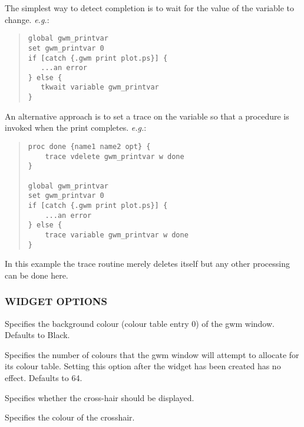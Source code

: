 The simplest way to detect completion is to wait for the value of the 
variable to change. {\em{e.g.}}: 

\begin{quote}
\begin{verbatim}
global gwm_printvar
set gwm_printvar 0
if [catch {.gwm print plot.ps}] {
   ...an error
} else {
   tkwait variable gwm_printvar
}
\end{verbatim}
\end{quote}

An alternative approach is to set a trace on the variable so that a 
procedure is invoked when the print completes. {\em{e.g.}}:

\begin{quote}
\begin{verbatim}
proc done {name1 name2 opt} {
    trace vdelete gwm_printvar w done
}

global gwm_printvar
set gwm_printvar 0
if [catch {.gwm print plot.ps}] {
    ...an error
} else {
    trace variable gwm_printvar w done
}
\end{verbatim}
\end{quote}

In this example the trace routine merely deletes itself but any other
processing can be done here.

\subsubsection{WIDGET OPTIONS}

\begin{rquote}
Specifies the background colour (colour table entry 0) of the gwm window.
Defaults to Black.
\end{rquote}

\begin{rquote}
Specifies the number of colours that the gwm window will attempt to allocate
for its colour table. Setting this option after the widget has been created 
has no effect. Defaults to 64.
\end{rquote}

\begin{rquote}
Specifies whether the cross-hair should be displayed.
\end{rquote}

\begin{rquote}
Specifies the colour of the crosshair.
\end{rquote}


